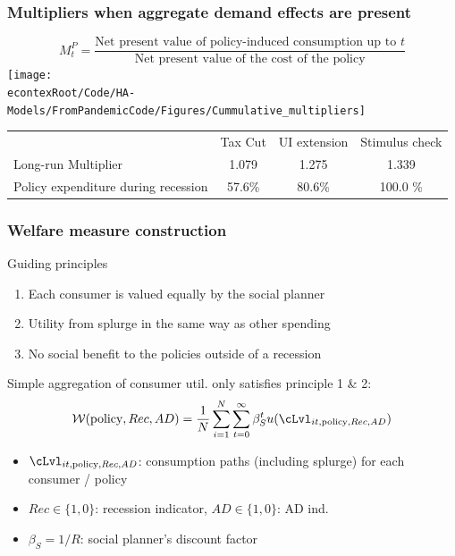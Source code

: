 \documentclass[pdflatex,aspectratio=169]{beamer}
\begin{document}
\begin{frame}
\frametitle{Multipliers when aggregate demand effects are present}
\begin{equation*}
M^P_t = \frac{\text{Net present value of policy-induced consumption up to $t$}}{\text{Net present value of the cost of the policy}}
\end{equation*}
\centering
\texttt{[image: \\econtexRoot/Code/HA-Models/FromPandemicCode/Figures/Cummulative\_multipliers]}
\footnotesize
\begin{tabular}{@{}lccc@{}} 
	& Tax Cut    & UI extension    & Stimulus check    \\ 
	Long-run Multiplier  &1.079  & 1.275  & 1.339     \\ 
	Policy expenditure during recession  &57.6\%  & 80.6\%  & 100.0 \%    \\ 
\end{tabular}  
\normalsize 
\end{frame}

\begin{frame}
\frametitle{Welfare measure construction}

	Guiding principles
	
	\begin{enumerate}
		\item Each consumer is valued equally by the social planner 
		\item Utility from splurge in the same way as other spending
		\item No social benefit to the policies outside of a recession
	\end{enumerate} 
	
	\vspace{0.6cm}
	
	Simple aggregation of consumer util. only satisfies principle 1 \& 2:
	\begin{align*}
	\mathcal{W}(\text{policy},Rec,AD) =\frac{1}{N}\sum_{i=1}^{N} \sum_{t=0}^{\infty} \beta_S^t u(\cLvl_{it,\text{policy},Rec,AD}) 
	\end{align*}
	
	\begin{itemize}
		\item $\cLvl_{it,\text{policy},Rec,AD}$: consumption paths (including splurge) for each consumer / policy
		\item $Rec\in\{1,0\}$: recession indicator, $AD\in\{1,0\}$: AD ind.
		\item $\beta_S = 1/R$: social planner's discount factor 
	\end{itemize}	

\end{frame}
\end{document}
